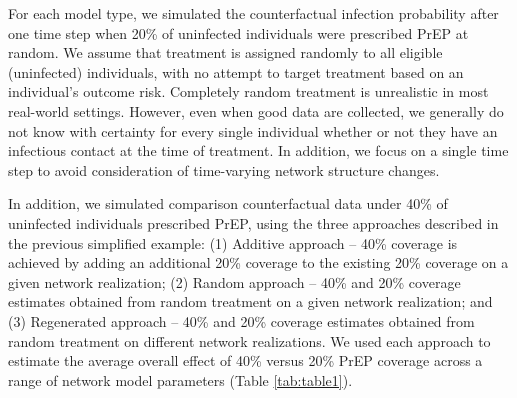 \documentclass{article}
\theoremstyle{definition}
\begin{document}
For each model type, we simulated the counterfactual infection probability after one time step when 20\% of uninfected individuals were prescribed PrEP at random. We assume that treatment is assigned randomly to all eligible (uninfected) individuals, with no attempt to target treatment based on an individual's outcome risk. Completely random treatment is unrealistic in most real-world settings. However, even when good data are collected, we generally do not know with certainty for every single individual whether or not they have an infectious contact at the time of treatment. In addition, we focus on a single time step to avoid consideration of time-varying network structure changes.

In addition, we simulated comparison counterfactual data under 40\% of uninfected individuals prescribed PrEP, using the three approaches described in the previous simplified example: (1) Additive approach -- 40\% coverage is achieved by adding an additional 20\% coverage to the existing 20\% coverage on a given network realization; (2) Random approach -- 40\% and 20\% coverage estimates obtained from random treatment on a given network realization; and (3) Regenerated approach -- 40\% and 20\% coverage estimates obtained from random treatment on different network realizations. We used each approach to estimate the average overall effect of 40\% versus 20\% PrEP coverage across a range of network model parameters (Table \ref{tab:table1}).
\end{document}
